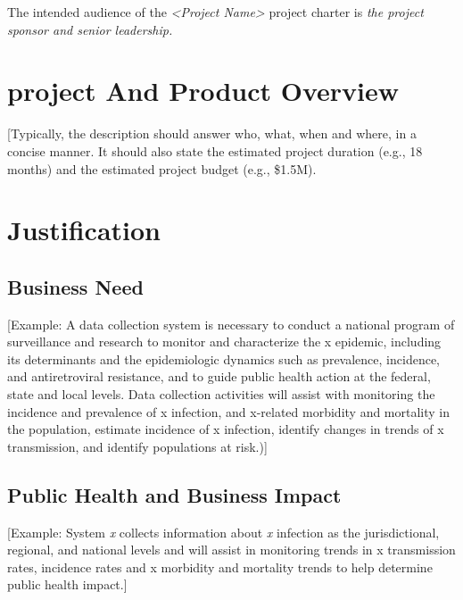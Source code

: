 The intended audience of the \emph{\textless{}Project
Name\textgreater{}} project charter is \emph{the project sponsor and
senior leadership.}

\hypertarget{project-and-product-overview}{%
\section{project And Product
Overview}\label{project-and-product-overview}}

{[}Typically, the description should answer who, what, when and where,
in a concise manner. It should also state the estimated project duration
(e.g., 18 months) and the estimated project budget (e.g., \$1.5M).

\hypertarget{justification}{%
\section{Justification}\label{justification}}

\hypertarget{business-need}{%
\subsection{Business Need}\label{business-need}}

{[}Example: A data collection system is necessary to conduct a national
program of surveillance and research to monitor and characterize the x
epidemic, including its determinants and the epidemiologic dynamics such
as prevalence, incidence, and antiretroviral resistance, and to guide
public health action at the federal, state and local levels. Data
collection activities will assist with monitoring the incidence and
prevalence of x infection, and x-related morbidity and mortality in the
population, estimate incidence of x infection, identify changes in
trends of x transmission, and identify populations at risk.){]}

\hypertarget{public-health-and-business-impact}{%
\subsection{Public Health and Business
Impact}\label{public-health-and-business-impact}}

{[}Example: System \emph{x} collects information about \emph{x}
infection as the jurisdictional, regional, and national levels and will
assist in monitoring trends in x transmission rates, incidence rates and
x morbidity and mortality trends to help determine public health
impact.{]}

